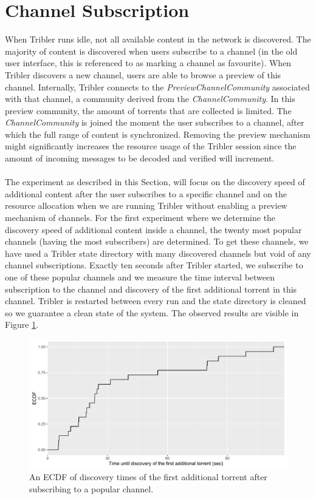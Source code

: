 \section{Channel Subscription}
When Tribler runs idle, not all available content in the network is discovered. The majority of content is discovered when users subscribe to a channel (in the old user interface, this is referenced to as marking a channel as favourite). When Tribler discovers a new channel, users are able to browse a preview of this channel. Internally, Tribler connects to the \emph{PreviewChannelCommunity} associated with that channel, a community derived from the \emph{ChannelCommunity}. In this preview community, the amount of torrents that are collected is limited. The \emph{ChannelCommunity} is joined the moment the user subscribes to a channel, after which the full range of content is synchronized. Removing the preview mechanism might significantly increases the resource usage of the Tribler session since the amount of incoming messages to be decoded and verified will increment.\\\\
The experiment as described in this Section, will focus on the discovery speed of additional content after the user subscribes to a specific channel and on the resource allocation when we are running Tribler without enabling a preview mechanism of channels. For the first experiment where we determine the discovery speed of additional content inside a channel, the twenty most popular channels (having the most subscribers) are determined. To get these channels, we have used a Tribler state directory with many discovered channels but void of any channel subscriptions. Exactly ten seconds after Tribler started, we subscribe to one of these popular channels and we measure the time interval between subscription to the channel and discovery of the first additional torrent in this channel. Tribler is restarted between every run and the state directory is cleaned so we guarantee a clean state of the system. The observed results are visible in Figure \ref{fig:channel-subscription}.

\begin{figure}[!h]
	\centering
	\includegraphics[width=1.0\columnwidth]{images/experiments/channel_subscription}
	\caption{An ECDF of discovery times of the first additional torrent after subscribing to a popular channel.}
	\label{fig:channel-subscription}
\end{figure}

